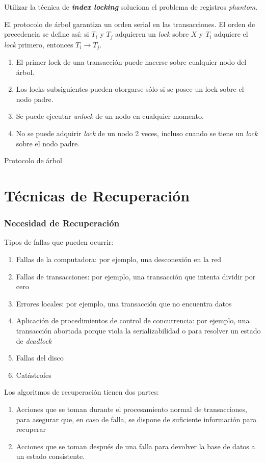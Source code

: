 \documentclass[a4paper, twoside]{article}
\begin{document}
Utilizar la técnica de \textbf{\emph{index locking}} soluciona el problema de registros \emph{phantom}.

El protocolo de árbol garantiza un orden serial en las transacciones. El orden de precedencia se define así: si $T_{i}$ y $T_{j}$ adquieren un \emph{lock} sobre $X$ y $T_{i}$ adquiere el \emph{lock} primero, entonces $T_{i} \to T_{j}$.

\begin{algorithm}[H]
	\begin{enumerate}
		\item El primer lock de una transacción puede hacerse sobre cualquier nodo del árbol.
		\item Los locks subsiguientes pueden otorgarse sólo si se posee un lock sobre el nodo padre.
		\item Se puede ejecutar \emph{unlock} de un nodo en cualquier momento.
		\item No se puede adquirir \emph{lock} de un nodo 2 veces, incluso cuando se tiene un \emph{lock }sobre el nodo padre.
	\end{enumerate}
	\caption{Protocolo de árbol}
\end{algorithm}

\newpage
\part{Técnicas de Recuperación}
\section{Necesidad de Recuperación}
Tipos de fallas que pueden ocurrir:
\begin{enumerate}
	\item Fallas de la computadora: por ejemplo, una desconexión en la red
	\item Fallas de transacciones: por ejemplo, una transacción que intenta dividir por cero
	\item Errores locales: por ejemplo, una transacción que no encuentra datos
	\item Aplicación de procedimientos de control de concurrencia: por ejemplo, una transacción abortada porque viola la serializabilidad o para resolver un estado de \emph{deadlock}
	\item Fallas del disco
	\item Catástrofes
\end{enumerate}

Los algoritmos de recuperación tienen dos partes:
\begin{enumerate}
	\item Acciones que se toman durante el procesamiento normal de transacciones, para asegurar que, en caso de falla, se dispone de suficiente información para recuperar
	\item Acciones que se toman después de una falla para devolver la base de datos a un estado consistente.
\end{enumerate}
\end{document}
